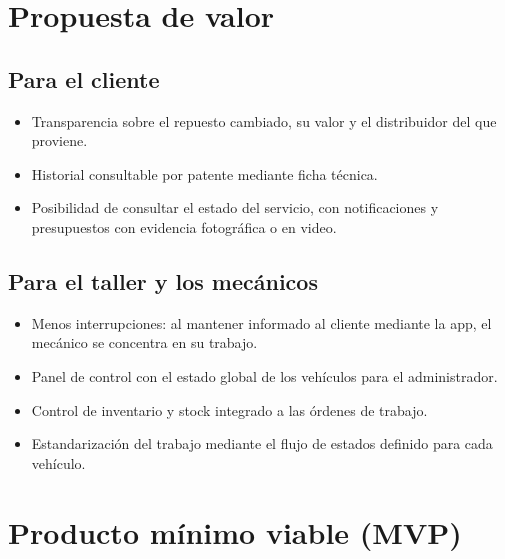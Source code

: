 \documentclass[11pt]{article}
\begin{document}
\section{Propuesta de valor}

\subsection{Para el cliente}

\begin{itemize}
  \item Transparencia sobre el repuesto cambiado, su valor y el distribuidor del que proviene.
  \item Historial consultable por patente mediante ficha técnica.
  \item Posibilidad de consultar el estado del servicio, con notificaciones y presupuestos con evidencia fotográfica o en video.
\end{itemize}

\subsection{Para el taller y los mecánicos}

\begin{itemize}
  \item Menos interrupciones: al mantener informado al cliente mediante la app, el mecánico se concentra en su trabajo.
  \item Panel de control con el estado global de los vehículos para el administrador.
  \item Control de inventario y stock integrado a las órdenes de trabajo.
  \item Estandarización del trabajo mediante el flujo de estados definido para cada vehículo.
\end{itemize}

\section{Producto mínimo viable (MVP)}
\end{document}
